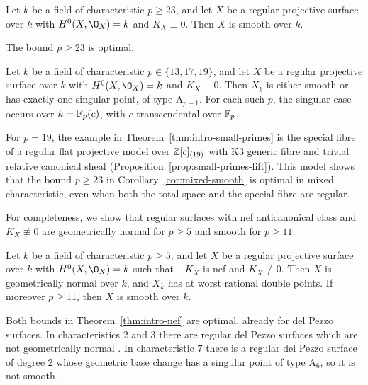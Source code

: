 \begin{theorem}\label{thm:intro-smooth}
Let $k$ be a field of characteristic $p\geq 23$, and let $X$ be a regular projective surface over $k$ with $H^0(X,\O_X) = k$ and $K_X\equiv 0$.
Then $X$ is smooth over $k$.
\end{theorem}

The bound $p\geq 23$ is optimal.
\begin{theorem}\label{thm:intro-small-primes}
Let $k$ be a field of characteristic $p\in\{13,17,19\}$, and let $X$ be a regular projective surface over $k$ with $H^0(X,\O_X) = k$ and $K_X\equiv 0$.
Then $X_{\bar k}$ is either smooth or has exactly one singular point, of type $\mathrm A_{p-1}$.
For each such $p$, the singular case occurs over $k = \mathbb{F}_p(c)$, with $c$ transcendental over $\mathbb{F}_p$.
\end{theorem}

\begin{remark}\label{rem:intro-smooth-optimal}
For $p = 19$, the example in Theorem~\ref{thm:intro-small-primes} is the special fibre of a regular flat projective model over $\mathbb{Z}[c]_{(19)}$ with K3 generic fibre and trivial relative canonical sheaf (Proposition~\ref{prop:small-primes-lift}).
This model shows that the bound $p\geq 23$ in Corollary~\ref{cor:mixed-smooth} is optimal in mixed characteristic, even when both the total space and the special fibre are regular.
\end{remark}

For completeness, we show that regular surfaces with nef anticanonical class and $K_X\not\equiv 0$ are geometrically normal for $p\geq 5$ and smooth for $p\geq 11$.
\begin{theorem}\label{thm:intro-nef}
Let $k$ be a field of characteristic $p\geq 5$, and let $X$ be a regular projective surface over $k$ with $H^0(X,\O_X) = k$ such that $-K_X$ is nef and $K_X\not\equiv 0$.
Then $X$ is geometrically normal over $k$, and $X_{\bar k}$ has at worst rational double points.
If moreover $p\geq 11$, then $X$ is smooth over $k$.
\end{theorem}

Both bounds in Theorem~\ref{thm:intro-nef} are optimal, already for del Pezzo surfaces.
In characteristics $2$ and $3$ there are regular del Pezzo surfaces which are not geometrically normal \cite[Example~2.3]{Ber24}.
In characteristic $7$ there is a regular del Pezzo surface of degree $2$ whose geometric base change has a singular point of type $\mathrm A_6$, so it is not smooth \cite[Example~2.3]{MS24}.

